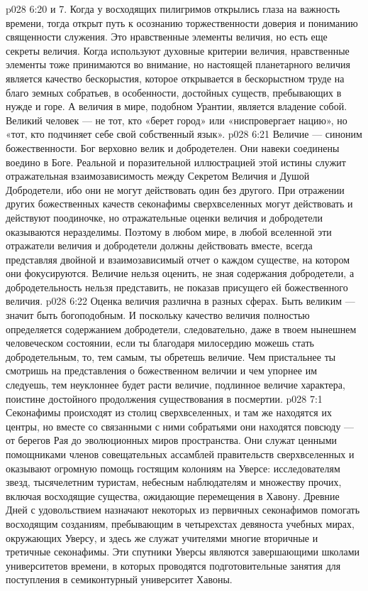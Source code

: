 \vs p028 6:20  и 7.  Когда у восходящих пилигримов открылись глаза на важность времени, тогда открыт путь к осознанию торжественности доверия и пониманию священности служения. Это нравственные элементы величия, но есть еще секреты величия. Когда используют духовные критерии величия, нравственные элементы тоже принимаются во внимание, но настоящей  планетарного величия является качество бескорыстия, которое открывается в бескорыстном труде на благо земных собратьев, в особенности, достойных существ, пребывающих в нужде и горе. А  величия в мире, подобном Урантии, является владение собой. Великий человек --- не тот, кто «берет город» или «ниспровергает нацию», но «тот, кто подчиняет себе свой собственный язык».
\vs p028 6:21 Величие --- синоним божественности. Бог верховно велик и добродетелен.  Они навеки соединены воедино в Боге. Реальной и поразительной иллюстрацией этой истины служит отражательная взаимозависимость между Секретом Величия и Душой Добродетели, ибо они не могут действовать один без другого. При отражении других божественных качеств секонафимы сверхвселенных могут действовать и действуют поодиночке, но отражательные оценки величия и добродетели оказываются неразделимы. Поэтому в любом мире, в любой вселенной эти отражатели величия и добродетели должны действовать вместе, всегда представляя двойной и взаимозависимый отчет о каждом существе, на котором они фокусируются. Величие нельзя оценить, не зная содержания добродетели, а добродетельность нельзя представить, не показав присущего ей божественного величия.
\vs p028 6:22 Оценка величия различна в разных сферах. Быть великим --- значит быть богоподобным. И поскольку качество величия полностью определяется содержанием добродетели, следовательно, даже в твоем нынешнем человеческом состоянии, если ты благодаря милосердию можешь стать добродетельным, то, тем самым, ты обретешь величие. Чем пристальнее ты смотришь на представления о божественном величии и чем упорнее им следуешь, тем неуклоннее будет расти величие, подлинное величие характера, поистине достойного продолжения существования в посмертии.
\vs p028 7:1 Секонафимы происходят из столиц сверхвселенных, и там же находятся их центры, но вместе со связанными с ними собратьями они находятся повсюду --- от берегов Рая до эволюционных миров пространства. Они служат ценными помощниками членов совещательных ассамблей правительств сверхвселенных и оказывают огромную помощь гостящим колониям на Уверсе: исследователям звезд, тысячелетним туристам, небесным наблюдателям и множеству прочих, включая восходящие существа, ожидающие перемещения в Хавону. Древние Дней с удовольствием назначают некоторых из первичных секонафимов помогать восходящим созданиям, пребывающим в четырехстах девяноста учебных мирах, окружающих Уверсу, и здесь же служат учителями многие вторичные и третичные секонафимы. Эти спутники Уверсы являются завершающими школами университетов времени, в которых проводятся подготовительные занятия для поступления в семиконтурный университет Хавоны.
